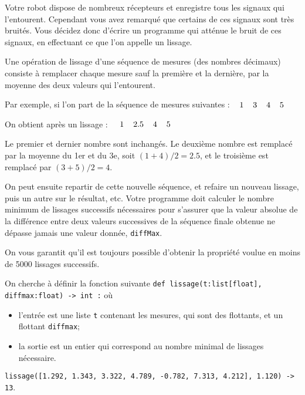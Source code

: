 Votre robot dispose de nombreux récepteurs et enregistre tous les signaux qui l'entourent. Cependant 
vous avez remarqué que certains de ces signaux sont très bruités. Vous décidez donc d'écrire un 
programme qui atténue le bruit de ces signaux, en effectuant ce que l'on appelle un lissage.

Une opération de lissage d'une séquence de mesures (des nombres décimaux) consiste à remplacer 
chaque mesure sauf la première et la dernière, par la moyenne des deux valeurs qui l'entourent.

Par exemple, si l'on part de la séquence de mesures suivantes :$\hspace{.4cm}1\hspace{.4cm} 3\hspace{.4cm} 4\hspace{.4cm} 5$

On obtient après un lissage : $\hspace{.4cm}1\hspace{.4cm} 2.5\hspace{.4cm} 4\hspace{.4cm} 5$

Le premier et dernier nombre sont inchangés. Le deuxième nombre est remplacé par la moyenne du 1er 
et du 3e, soit $(1+4)/2 = 2.5$, et le troisième est remplacé par $(3+5)/2 = 4$.

On peut ensuite repartir de cette nouvelle séquence, et refaire un nouveau lissage, puis un autre 
sur le résultat, etc.
Votre programme doit calculer le nombre minimum de lissages successifs nécessaires pour s'assurer 
que la valeur absolue de la différence entre deux valeurs successives de la séquence finale obtenue 
ne dépasse jamais une valeur donnée, \texttt{diffMax}.

On vous garantit qu'il est toujours possible d'obtenir la propriété voulue en moins de 5000 lissages 
successifs.

On cherche à définir la fonction suivante \texttt{def lissage(t:list[float], diffmax:float) -> int :} où
\begin{itemize} 
\item l'entrée est une liste \texttt{t} contenant les mesures, qui sont des flottants, et un 
flottant \texttt{diffmax};
\item la sortie est un entier qui correspond au nombre minimal de lissages nécessaire.
\end{itemize}
\begin{exemple}
\noindent \texttt{lissage([1.292, 1.343, 3.322, 4.789, -0.782, 7.313, 4.212], 1.120) -> 13}.
\end{exemple}